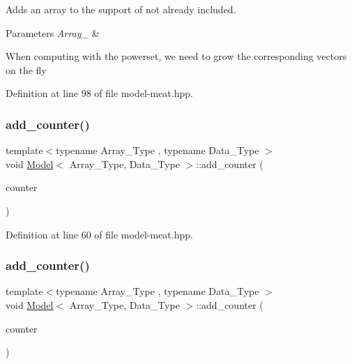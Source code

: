 Adds an array to the support of not already included. 


\begin{DoxyParams}{Parameters}
{\em Array\+\_\+} & \\
\hline
\end{DoxyParams}
When computing with the powerset, we need to grow the corresponding vectors on the fly 

Definition at line 98 of file model-\/meat.\+hpp.

\mbox{\label{class_model_a1ed91acc6c747eabc8a83726c0ec7de5}} 
\subsubsection{\texorpdfstring{add\+\_\+counter()}{add\_counter()}\hspace{0.1cm}{\footnotesize\ttfamily [1/3]}}
{\footnotesize\ttfamily template$<$typename Array\+\_\+\+Type , typename Data\+\_\+\+Type $>$ \\
void \hyperlink{class_model}{Model}$<$ Array\+\_\+\+Type, Data\+\_\+\+Type $>$\+::add\+\_\+counter (\begin{DoxyParamCaption}\item[{\hyperlink{class_counter}{Counter}$<$ Array\+\_\+\+Type, Data\+\_\+\+Type $>$ \&}]{counter }\end{DoxyParamCaption})\hspace{0.3cm}{\ttfamily [inline]}}



Definition at line 60 of file model-\/meat.\+hpp.

\mbox{\label{class_model_a05265a5a9a12109a4a2b56b3bb42015e}} 
\subsubsection{\texorpdfstring{add\+\_\+counter()}{add\_counter()}\hspace{0.1cm}{\footnotesize\ttfamily [2/3]}}
{\footnotesize\ttfamily template$<$typename Array\+\_\+\+Type , typename Data\+\_\+\+Type $>$ \\
void \hyperlink{class_model}{Model}$<$ Array\+\_\+\+Type, Data\+\_\+\+Type $>$\+::add\+\_\+counter (\begin{DoxyParamCaption}\item[{\hyperlink{class_counter}{Counter}$<$ Array\+\_\+\+Type, Data\+\_\+\+Type $>$ $\ast$}]{counter }\end{DoxyParamCaption})\hspace{0.3cm}{\ttfamily [inline]}}



